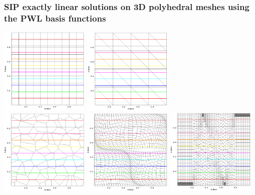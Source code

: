 \documentclass[compress,10pt]{beamer}
\begin{document}
\begin{frame}[t]\frametitle{SIP exactly linear solutions on 3D polyhedral meshes using the PWL basis functions}
\centering
\includegraphics[width=0.32\textwidth]{images/cart_lin_contour.png} 
\includegraphics[width=0.32\textwidth]{images/tri_lin_contour.png} \\
\vspace{0.2cm}
\includegraphics[width=0.32\textwidth]{images/poly_lin_contour.png} 
\includegraphics[width=0.32\textwidth]{images/sine_poly_lin_contour.png} 
\includegraphics[width=0.32\textwidth]{images/z_poly_lin_contour.png} 
\end{frame}
\end{document}
